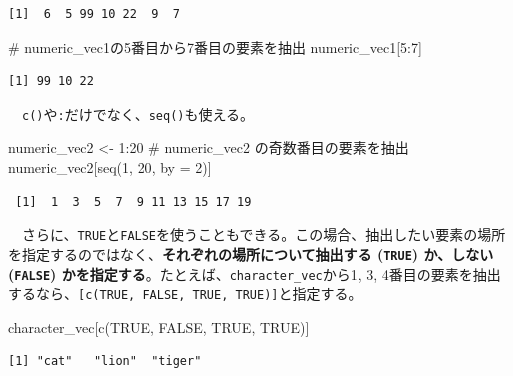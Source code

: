 \documentclass[
  a4paper,
  pandoc,
  ja=standard,
  jafont=haranoaji]{bxjsbook}
\newenvironment{Shaded}{\begin{snugshade}}{\end{snugshade}}
\newcommand{\AttributeTok}[1]{\textcolor[rgb]{0.00,0.48,0.65}{#1}}
\newcommand{\CommentTok}[1]{\textcolor[rgb]{0.37,0.37,0.37}{#1}}
\newcommand{\ConstantTok}[1]{\textcolor[rgb]{0.56,0.35,0.01}{#1}}
\newcommand{\DecValTok}[1]{\textcolor[rgb]{0.68,0.00,0.00}{#1}}
\newcommand{\FunctionTok}[1]{\textcolor[rgb]{0.28,0.35,0.67}{#1}}
\newcommand{\NormalTok}[1]{\textcolor[rgb]{0.00,0.48,0.65}{#1}}
\newcommand{\OtherTok}[1]{\textcolor[rgb]{0.00,0.48,0.65}{#1}}
\newcommand{\SpecialCharTok}[1]{\textcolor[rgb]{0.37,0.37,0.37}{#1}}
\begin{document}
\begin{verbatim}
[1]  6  5 99 10 22  9  7
\end{verbatim}

\begin{Shaded}
\begin{Highlighting}[numbers=left,,]
\CommentTok{\# numeric\_vec1の5番目から7番目の要素を抽出}
\NormalTok{numeric\_vec1[}\DecValTok{5}\SpecialCharTok{:}\DecValTok{7}\NormalTok{]}
\end{Highlighting}
\end{Shaded}

\begin{verbatim}
[1] 99 10 22
\end{verbatim}

　\texttt{c()}や\texttt{:}だけでなく、\texttt{seq()}も使える。

\begin{Shaded}
\begin{Highlighting}[numbers=left,,]
\NormalTok{numeric\_vec2 }\OtherTok{\textless{}{-}} \DecValTok{1}\SpecialCharTok{:}\DecValTok{20}
\CommentTok{\# numeric\_vec2 の奇数番目の要素を抽出}
\NormalTok{numeric\_vec2[}\FunctionTok{seq}\NormalTok{(}\DecValTok{1}\NormalTok{, }\DecValTok{20}\NormalTok{, }\AttributeTok{by =} \DecValTok{2}\NormalTok{)]}
\end{Highlighting}
\end{Shaded}

\begin{verbatim}
 [1]  1  3  5  7  9 11 13 15 17 19
\end{verbatim}

　さらに、\texttt{TRUE}と\texttt{FALSE}を使うこともできる。この場合、抽出したい要素の場所を指定するのではなく、\textbf{それぞれの場所について抽出する
(\texttt{TRUE}) か、しない (\texttt{FALSE})
かを指定する}。たとえば、\texttt{character\_vec}から1, 3,
4番目の要素を抽出するなら、\texttt{{[}c(TRUE,\ FALSE,\ TRUE,\ TRUE){]}}と指定する。

\begin{Shaded}
\begin{Highlighting}[numbers=left,,]
\NormalTok{character\_vec[}\FunctionTok{c}\NormalTok{(}\ConstantTok{TRUE}\NormalTok{, }\ConstantTok{FALSE}\NormalTok{, }\ConstantTok{TRUE}\NormalTok{, }\ConstantTok{TRUE}\NormalTok{)]}
\end{Highlighting}
\end{Shaded}

\begin{verbatim}
[1] "cat"   "lion"  "tiger"
\end{verbatim}
\end{document}
